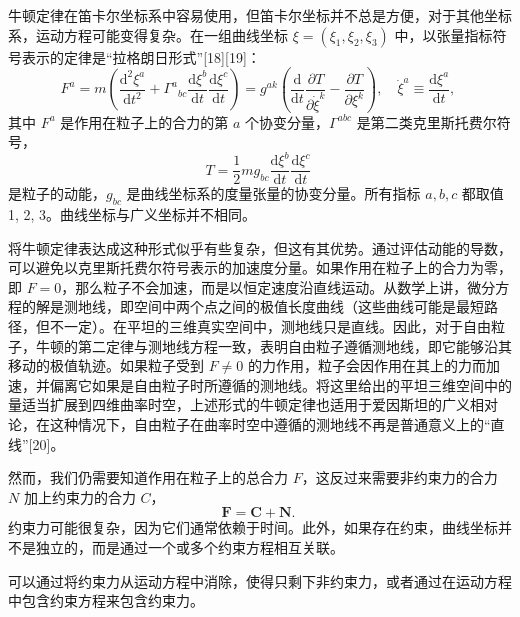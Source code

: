 牛顿定律在笛卡尔坐标系中容易使用，但笛卡尔坐标并不总是方便，对于其他坐标系，运动方程可能变得复杂。在一组曲线坐标 \(\xi = (\xi_1, \xi_2, \xi_3)\) 中，以张量指标符号表示的定律是“拉格朗日形式”[18][19]：
\[
F^{a} = m\left(\frac{\mathrm{d}^{2}\xi^{a}}{\mathrm{d}t^{2}} + \Gamma^{a}{}_{bc} \frac{\mathrm{d}\xi^{b}}{\mathrm{d}t} \frac{\mathrm{d}\xi^{c}}{\mathrm{d}t}\right) = g^{ak}\left(\frac{\mathrm{d}}{\mathrm{d}t} \frac{\partial T}{\partial \dot{\xi}^{k}} - \frac{\partial T}{\partial \xi^{k}}\right), \quad \dot{\xi}^{a} \equiv \frac{\mathrm{d}\xi^{a}}{\mathrm{d}t},~
\]
其中 \(F^{a}\) 是作用在粒子上的合力的第 \(a\) 个协变分量，\(\Gamma^{abc}\) 是第二类克里斯托费尔符号，
\[
T = \frac{1}{2}mg_{bc} \frac{\mathrm{d}\xi^{b}}{\mathrm{d}t} \frac{\mathrm{d}\xi^{c}}{\mathrm{d}t}~
\]
是粒子的动能，\(g_{bc}\) 是曲线坐标系的度量张量的协变分量。所有指标 \(a, b, c\) 都取值 1, 2, 3。曲线坐标与广义坐标并不相同。

将牛顿定律表达成这种形式似乎有些复杂，但这有其优势。通过评估动能的导数，可以避免以克里斯托费尔符号表示的加速度分量。如果作用在粒子上的合力为零，即 \(F = 0\)，那么粒子不会加速，而是以恒定速度沿直线运动。从数学上讲，微分方程的解是测地线，即空间中两个点之间的极值长度曲线（这些曲线可能是最短路径，但不一定）。在平坦的三维真实空间中，测地线只是直线。因此，对于自由粒子，牛顿的第二定律与测地线方程一致，表明自由粒子遵循测地线，即它能够沿其移动的极值轨迹。如果粒子受到 \(F \neq 0\) 的力作用，粒子会因作用在其上的力而加速，并偏离它如果是自由粒子时所遵循的测地线。将这里给出的平坦三维空间中的量适当扩展到四维曲率时空，上述形式的牛顿定律也适用于爱因斯坦的广义相对论，在这种情况下，自由粒子在曲率时空中遵循的测地线不再是普通意义上的“直线”[20]。

然而，我们仍需要知道作用在粒子上的总合力 \(F\)，这反过来需要非约束力的合力 \(N\) 加上约束力的合力 \(C\)，
\[
\mathbf{F} = \mathbf{C} + \mathbf{N}.~
\]
约束力可能很复杂，因为它们通常依赖于时间。此外，如果存在约束，曲线坐标并不是独立的，而是通过一个或多个约束方程相互关联。

可以通过将约束力从运动方程中消除，使得只剩下非约束力，或者通过在运动方程中包含约束方程来包含约束力。
